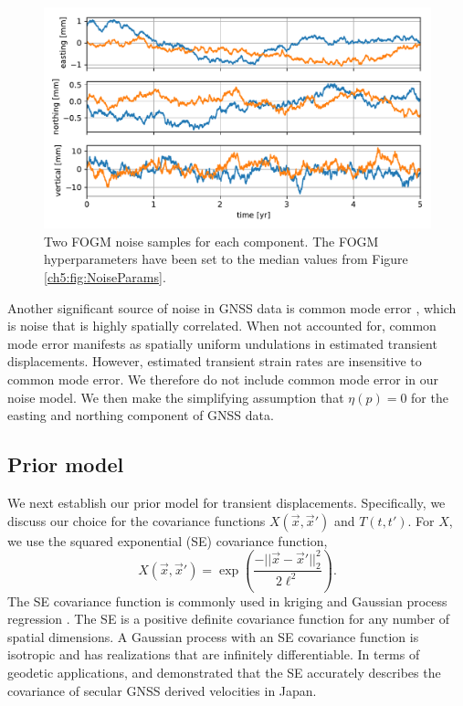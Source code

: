 \begin{figure}
\includegraphics{ch5/figures/noise/noise-samples.pdf}
\caption{Two FOGM noise samples for each component. The FOGM
hyperparameters have been set to the median values from Figure
\ref{ch5:fig:NoiseParams}.}
\label{ch5:fig:NoiseSamples}
\end{figure}

Another significant source of noise in GNSS data is common mode error
\citep[e.g.,][]{Wdowinski1997,Dong2006}, which is noise that is highly
spatially correlated. When not accounted for, common mode error
manifests as spatially uniform undulations in estimated transient
displacements. However, estimated transient strain rates are
insensitive to common mode error. We therefore do not include common
mode error in our noise model. We then make the simplifying assumption
that $\eta(p) = 0$ for the easting and northing component of GNSS
data.

\subsection{Prior model}\label{ch5:sec:SignalModel}
We next establish our prior model for transient displacements.
Specifically, we discuss our choice for the covariance functions
$X(\vec{x},\vec{x}')$ and $T(t,t')$. For $X$, we use the squared
exponential (SE) covariance function,
\begin{equation}\label{ch5:eq:SE}
X(\vec{x},\vec{x}') = \exp\left(\frac{-||\vec{x} - \vec{x}'||_2^2}{2 \ell^2}\right).
\end{equation}
The SE covariance function is commonly used in kriging
\citep[e.g,][]{Cressie1992} and Gaussian process regression
\citep[e.g.,][]{Rasmussen2006}. The SE is a positive definite
covariance function for any number of spatial dimensions. A Gaussian
process with an SE covariance function is isotropic and has
realizations that are infinitely differentiable. In terms of geodetic
applications, \citet{Kato1998} and \cite{El-Fiky1999} demonstrated
that the SE accurately describes the covariance of secular GNSS
derived velocities in Japan.

